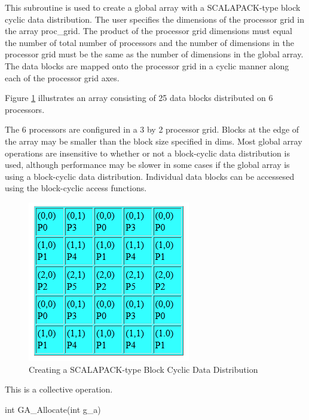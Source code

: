 \documentclass[12pt]{article}
\begin{document}
\begin{desc}

  This subroutine is used to create a global array with a
  SCALAPACK-type block cyclic data distribution. The user specifies
  the dimensions of the processor grid in the array proc_grid. The
  product of the processor grid dimensions must equal the number of
  total number of processors and the number of dimensions in the
  processor grid must be the same as the number of dimensions in the
  global array. The data blocks are mapped onto the processor grid in
  a cyclic manner along each of the processor grid axes.

Figure \ref{setblkcyprocgrid} illustrates an array consisting of 25 data blocks distributed on 6 processors.

The 6 processors are configured in a 3 by 2 processor grid. Blocks at
the edge of the array may be smaller than the block size specified in dims.
Most global array operations  are insensitive to whether or not a block-cyclic
data distribution is used, although performance may be slower in some cases
if the global array is using a block-cyclic data distribution. Individual data
blocks can be accessesed using the block-cyclic access functions.

\begin{figure}
\centering
\includegraphics{SetBlkCyProcGrid}
\caption{Creating a SCALAPACK-type Block Cyclic Data Distribution}
\label{setblkcyprocgrid}
\end{figure}

  This is a collective operation.

\end{desc}


\begin{capi}
\begin{ccode}
int GA_Allocate(int g_a)
\end{ccode}
\begin{funcargs}
\end{funcargs}
\end{capi}
\end{document}

